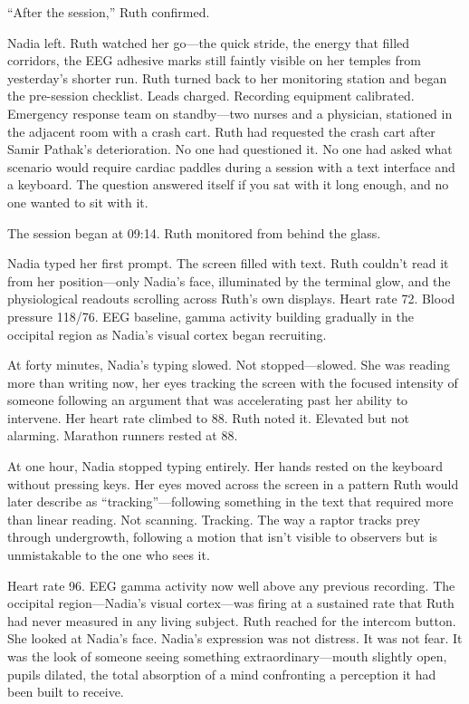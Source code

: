 ``After the session,'' Ruth confirmed.

Nadia left. Ruth watched her go---the quick stride, the energy that filled corridors, the EEG adhesive marks still faintly visible on her temples from yesterday's shorter run. Ruth turned back to her monitoring station and began the pre-session checklist. Leads charged. Recording equipment calibrated. Emergency response team on standby---two nurses and a physician, stationed in the adjacent room with a crash cart. Ruth had requested the crash cart after Samir Pathak's deterioration. No one had questioned it. No one had asked what scenario would require cardiac paddles during a session with a text interface and a keyboard. The question answered itself if you sat with it long enough, and no one wanted to sit with it.

\scenebreak

The session began at 09:14. Ruth monitored from behind the glass.

Nadia typed her first prompt. The screen filled with text. Ruth couldn't read it from her position---only Nadia's face, illuminated by the terminal glow, and the physiological readouts scrolling across Ruth's own displays. Heart rate 72. Blood pressure 118/76. EEG baseline, gamma activity building gradually in the occipital region as Nadia's visual cortex began recruiting.

At forty minutes, Nadia's typing slowed. Not stopped---slowed. She was reading more than writing now, her eyes tracking the screen with the focused intensity of someone following an argument that was accelerating past her ability to intervene. Her heart rate climbed to 88. Ruth noted it. Elevated but not alarming. Marathon runners rested at 88.

At one hour, Nadia stopped typing entirely. Her hands rested on the keyboard without pressing keys. Her eyes moved across the screen in a pattern Ruth would later describe as ``tracking''---following something in the text that required more than linear reading. Not scanning. Tracking. The way a raptor tracks prey through undergrowth, following a motion that isn't visible to observers but is unmistakable to the one who sees it.

Heart rate 96. EEG gamma activity now well above any previous recording. The occipital region---Nadia's visual cortex---was firing at a sustained rate that Ruth had never measured in any living subject. Ruth reached for the intercom button. She looked at Nadia's face. Nadia's expression was not distress. It was not fear. It was the look of someone seeing something extraordinary---mouth slightly open, pupils dilated, the total absorption of a mind confronting a perception it had been built to receive.

